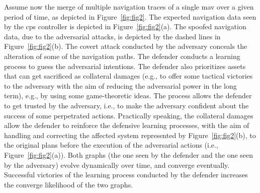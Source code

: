 \documentclass[letterpaper, 10pt, conference]{IEEEtran}
\begin{document}
Assume now the merge of multiple navigation traces of a single \gls*{mav} over a given period of time, as depicted in
Figure~\ref{fig:fig2}. The expected navigation data seen by the \gls*{cps}
controller is depicted in Figure~\ref{fig:fig2}(a). The spoofed
navigation data, due to the adversarial attacks, is depicted  by the 
dashed lines in Figure~\ref{fig:fig2}(b). The covert attack conducted 
by the adversary conceals the alteration of some of the navigation 
paths. The defender conducts a learning process to guess the adversarial
intentions. The defender also prioritizes assets that can get
sacrificed as collateral damages (e.g., to offer some tactical
victories to the adversary with the aim of reducing the adversarial
power in the long term), e.g., by using some game-theoretic ideas. 
The process allows the defender to get trusted by the adversary, i.e., 
to make the adversary confident about the success of some 
perpetrated actions. Practically speaking, the collateral damages 
allow the defender to reinforce the defensive learning processes, 
with the aim of handling and correcting the affected system 
represented by Figure~\ref{fig:fig2}(b), to the original plans before 
the execution of the adversarial actions (i.e., Figure~\ref{fig:fig2}(a)). Both graphs (the one seen by the defender and the one seen by 
the adversary) evolve dynamically over time, and converge 
eventually. Successful victories of the learning process
conducted by the defender increases the converge likelihood 
of the two graphs.

\end{document}
